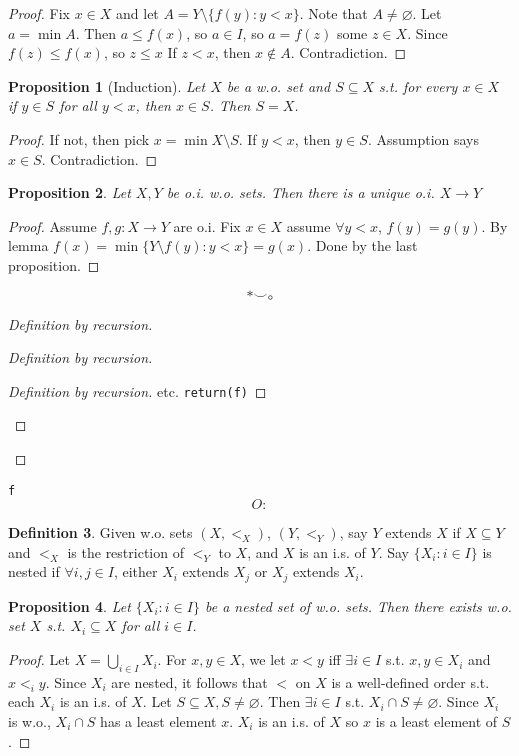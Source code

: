 \documentclass{article}
\theoremstyle{definition}
\newtheorem{defn}{Definition}[section]
\theoremstyle{remark}
\theoremstyle{plain}
\newtheorem{prop}[defn]{Proposition}
\begin{document}
\begin{proof}
    Fix $x\in X$ and let $A=Y\setminus\{f(y):y<x\}$. Note that $A\neq\varnothing$. Let $a=\min A$. Then $a\le f(x)$, so $a\in I$, so $a=f(z)$ some $z\in X$. Since $f(z)\le f(x)$, so $z\le x$ If $z<x$, then $x\not\in A$. Contradiction. 
\end{proof}
\begin{prop}[Induction]
    Let $X$ be a w.o. set and $S\subseteq X$ s.t. for every $x\in X$ if $y\in S$ for all $y<x$, then $x\in S$. Then $S=X$.
\end{prop}
\begin{proof}
    If not, then pick $x=\min X\setminus S$. If $y<x$, then $y\in S$. Assumption says $x\in S$. Contradiction.
\end{proof}
\begin{prop}
    Let $X, Y$ be o.i. w.o. sets. Then there is a unique o.i. $X\to Y$
\end{prop}
\begin{proof}
    Assume $f,g:X\to Y$ are o.i. Fix $x\in X$ assume $\forall y<x$, $f(y)=g(y)$. By lemma $f(x)=\min \{Y\setminus f(y):y<x\}=g(x)$. Done by the last proposition.
\end{proof}
\[*\smile\circ\tag{Owen's Signature}\]
\begin{proof}[Definition by recursion]
    \begin{proof}[Definition by recursion]
        \begin{proof}[Definition by recursion]
            etc.
            \texttt{return(f)}
        \end{proof}
    \end{proof}
\end{proof}
\texttt{f}
\[O:\tag{Owen's signature}\]

\begin{defn}
    Given w.o. sets $(X,<_X)$, $(Y,<_Y)$, say $Y$ extends $X$ if $X\subseteq Y$ and $<_X$ is the restriction of $<_Y$ to $X$, and $X$ is an i.s. of $Y$. Say $\{X_i:i\in I\}$ is nested if $\forall i,j\in I$, either $X_i$ extends $X_j$ or $X_j$ extends $X_i$.
\end{defn}
\begin{prop}
    Let $\{X_i:i\in I\}$ be a nested set of w.o. sets. Then there exists w.o. set $X$ s.t. $X_i\subseteq X$ for all $i\in I$.
\end{prop}
\begin{proof}
    Let $X=\bigcup_{i\in I}X_i$. For $x,y\in X$, we let $x<y$ iff $\exists i\in I$ s.t. $x,y\in X_i$ and $x<_i y$. Since $X_i$ are nested, it follows that $<$ on $X$ is a well-defined order s.t. each $X_i$ is an i.s. of $X$.
    Let $S\subseteq X, S\neq\varnothing$. Then $\exists i\in I$ s.t. $X_i\cap S\neq\varnothing$. Since $X_i$ is w.o., $X_i\cap S$ has a least element $x$. $X_i$ is an i.s. of $X$ so $x$ is a least element of $S$.
\end{proof}
\end{document}
